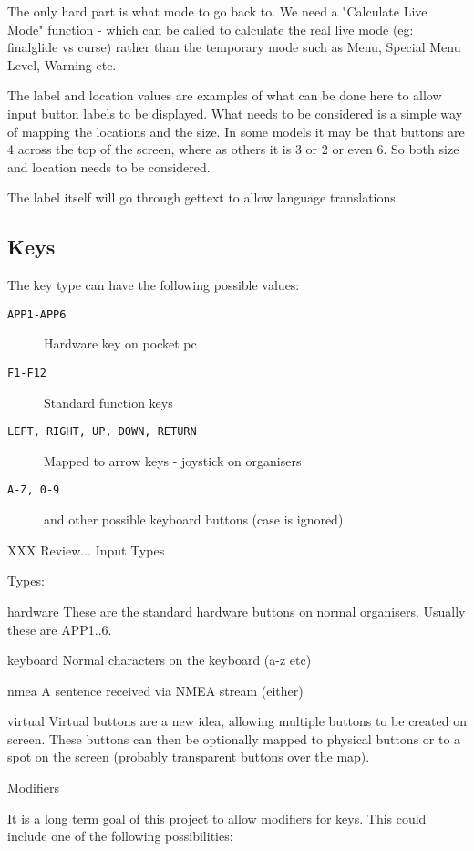 The only hard part is what mode to go back to. We need a 
"Calculate Live Mode" function - which can be called to calculate the
real live mode (eg: finalglide vs curse) rather than the temporary
mode such as Menu, Special Menu Level, Warning etc.

The label and location values are examples of what can be done here
to allow input button labels to be displayed. What needs to be 
considered is a simple way of mapping the locations and the size.
In some models it may be that buttons are 4 across the top of the
screen, where as others it is 3 or 2 or even 6. So both size and
location needs to be considered.

The label itself will go through gettext to allow language
translations.

\subsection{Keys}

The key type can have the following possible values:

\begin{description}
\item[\texttt{APP1-APP6}] Hardware key on pocket pc
\item[\texttt{F1-F12}] Standard function keys
\item[\texttt{LEFT, RIGHT, UP, DOWN, RETURN}] Mapped to arrow keys - joystick on
  organisers
\item[\texttt{A-Z, 0-9}] and other possible keyboard buttons (case is ignored)
\end{description}


XXX Review...
Input Types

Types:

hardware	These are the standard hardware buttons 
on normal organisers. Usually these are
APP1..6.

keyboard	Normal characters on the keyboard (a-z etc)

nmea		A sentence received via NMEA stream (either)

virtual		Virtual buttons are a new idea, allowing
multiple buttons to be created on screen.
These buttons can then be optionally mapped
to physical buttons or to a spot on the 
screen (probably transparent buttons over 
the map).

Modifiers

It is a long term goal of this project to allow modifiers for keys.
This could include one of the following possibilities:

